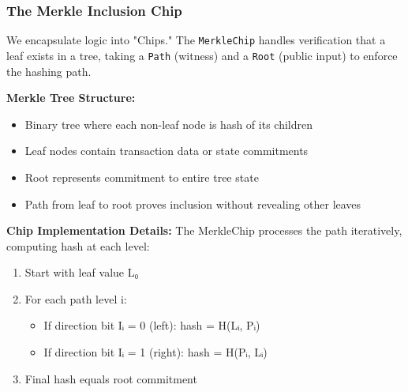 \documentclass[11pt,a4paper]{article}
\begin{document}
\subsubsection{The Merkle Inclusion Chip}
We encapsulate logic into "Chips." The \texttt{MerkleChip} handles verification that a leaf exists in a tree, taking a \texttt{Path} (witness) and a \texttt{Root} (public input) to enforce the hashing path.

\textbf{Merkle Tree Structure:}
\begin{itemize}
    \item Binary tree where each non-leaf node is hash of its children
    \item Leaf nodes contain transaction data or state commitments
    \item Root represents commitment to entire tree state
    \item Path from leaf to root proves inclusion without revealing other leaves
\end{itemize}

\textbf{Chip Implementation Details:}
The MerkleChip processes the path iteratively, computing hash at each level:
\begin{enumerate}
    \item Start with leaf value L₀
    \item For each path level i:
        \begin{itemize}
            \item If direction bit Iᵢ = 0 (left): hash = H(Lᵢ, Pᵢ)
            \item If direction bit Iᵢ = 1 (right): hash = H(Pᵢ, Lᵢ)
        \end{itemize}
    \item Final hash equals root commitment
\end{enumerate}
\end{document}
